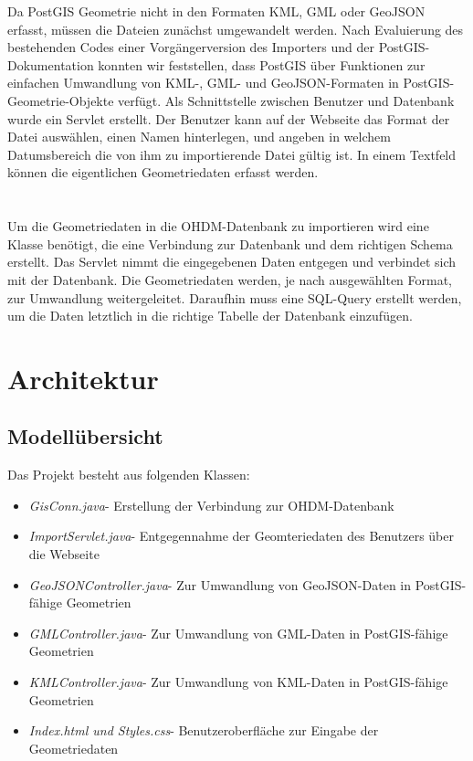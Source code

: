 \documentclass[]{article}
\begin{document}
Da PostGIS Geometrie nicht in den Formaten KML, GML oder GeoJSON erfasst, müssen die Dateien zunächst umgewandelt werden. Nach Evaluierung des bestehenden Codes einer Vorgängerversion des Importers und der PostGIS-Dokumentation konnten wir feststellen, dass PostGIS über Funktionen zur einfachen Umwandlung von KML-, GML- und GeoJSON-Formaten in PostGIS-Geometrie-Objekte verfügt. Als Schnittstelle zwischen Benutzer und Datenbank wurde ein Servlet erstellt. Der Benutzer kann auf der Webseite das Format der Datei auswählen, einen Namen hinterlegen, und angeben in welchem Datumsbereich die von ihm zu importierende Datei gültig ist. In einem Textfeld können die eigentlichen Geometriedaten erfasst werden.\\
\\
\\
Um die Geometriedaten in die OHDM-Datenbank zu importieren wird eine Klasse benötigt, die eine Verbindung zur Datenbank und dem richtigen Schema erstellt. Das Servlet nimmt die eingegebenen Daten entgegen und verbindet sich mit der Datenbank. Die Geometriedaten werden, je nach ausgewählten Format, zur Umwandlung weitergeleitet. Daraufhin muss eine SQL-Query erstellt werden, um die Daten letztlich in die richtige Tabelle der Datenbank einzufügen.

\section{Architektur}
\subsection{Modellübersicht}
Das Projekt besteht aus folgenden Klassen:
\begin{itemize}
	\item \textit{GisConn.java}- Erstellung der Verbindung zur OHDM-Datenbank
	\item \textit{ImportServlet.java}- Entgegennahme der Geomteriedaten des Benutzers über die Webseite
	\item \textit{GeoJSONController.java}- Zur Umwandlung von GeoJSON-Daten in PostGIS-fähige Geometrien
	\item \textit{GMLController.java}- Zur Umwandlung von GML-Daten in PostGIS-fähige Geometrien
	\item \textit{KMLController.java}- Zur Umwandlung von KML-Daten in PostGIS-fähige Geometrien
	\newline
	\item \textit{Index.html und Styles.css}- Benutzeroberfläche zur Eingabe der Geometriedaten
\end{itemize}
\end{document}
